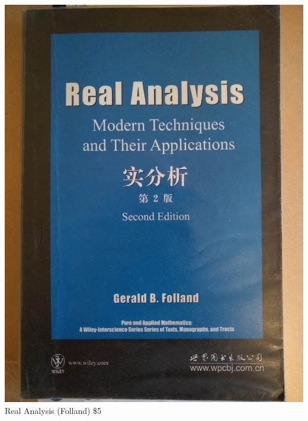 \documentclass[t]{beamer}
\newcommand{\htarget}[2]{\hypertarget{#1}{#2}}
\begin{document}
\begin{frame}\htarget{RAF}{} \begin{center}
\includegraphics[height=0.8\textheight]{Real_Analysis_Folland_mini.jpg} \\
Real Analysis (Folland) \$5
\end{center} \end{frame}
\end{document}

